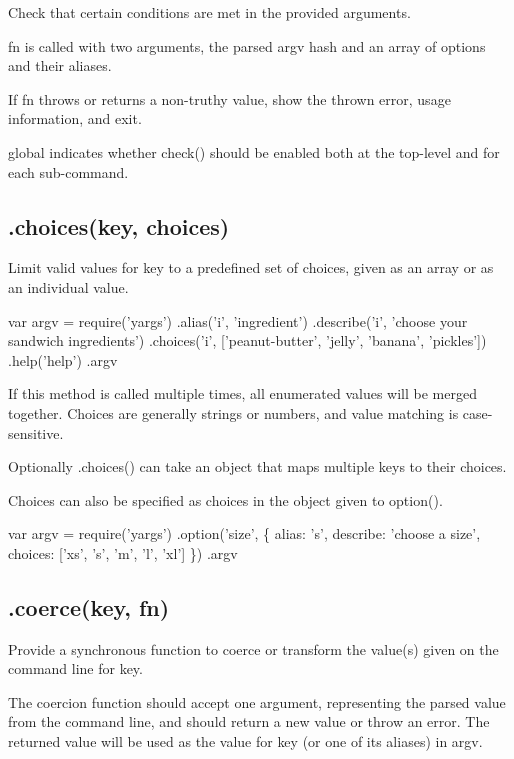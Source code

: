 Check that certain conditions are met in the provided arguments.

{\ttfamily fn} is called with two arguments, the parsed {\ttfamily argv} hash and an array of options and their aliases.

If {\ttfamily fn} throws or returns a non-\/truthy value, show the thrown error, usage information, and exit.

{\ttfamily global} indicates whether {\ttfamily check()} should be enabled both at the top-\/level and for each sub-\/command.

\subsection*{\label{_choices}%
.choices(key, choices) }

Limit valid values for {\ttfamily key} to a predefined set of {\ttfamily choices}, given as an array or as an individual value.


\begin{DoxyCode}
var argv = require('yargs')
  .alias('i', 'ingredient')
  .describe('i', 'choose your sandwich ingredients')
  .choices('i', ['peanut-butter', 'jelly', 'banana', 'pickles'])
  .help('help')
  .argv
\end{DoxyCode}


If this method is called multiple times, all enumerated values will be merged together. Choices are generally strings or numbers, and value matching is case-\/sensitive.

Optionally {\ttfamily .choices()} can take an object that maps multiple keys to their choices.

Choices can also be specified as {\ttfamily choices} in the object given to {\ttfamily option()}.


\begin{DoxyCode}
var argv = require('yargs')
  .option('size', \{
    alias: 's',
    describe: 'choose a size',
    choices: ['xs', 's', 'm', 'l', 'xl']
  \})
  .argv
\end{DoxyCode}


\subsection*{\label{_coerce}%
.coerce(key, fn) }

Provide a synchronous function to coerce or transform the value(s) given on the command line for {\ttfamily key}.

The coercion function should accept one argument, representing the parsed value from the command line, and should return a new value or throw an error. The returned value will be used as the value for {\ttfamily key} (or one of its aliases) in {\ttfamily argv}.

